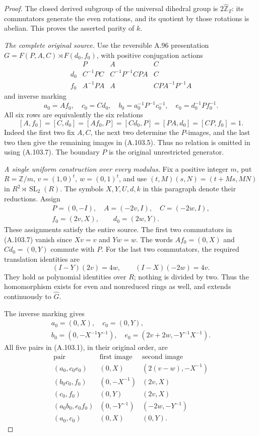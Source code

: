 \begin{proof}
The closed derived subgroup of the universal dihedral group is
\(2\widehat{\mathbb Z}_{T}\): its commutators generate the even
rotations, and its quotient by those rotations is abelian.
This proves the asserted parity of \(k\).

\emph{The complete original source.}
Use the reversible A.96 presentation
\(G=F(P,A,C)\rtimes F(d_0,f_0)\), with positive conjugation actions
\[
 \begin{array}{c|ccc}
    &P&A&C\\ \hline
 d_0&C^{-1}PC&C^{-1}P^{-1}CPA&C\\
 f_0&A^{-1}PA&A&CPA^{-1}P^{-1}A
 \end{array}
 \tag{A.103.5}
\]
and inverse marking
\[
 a_0=Af_0,\quad c_0=Cd_0,\quad
 b_0=a_0^{-1}P^{-1}c_0^{-1},\quad
 e_0=d_0^{-1}Pf_0^{-1}.
 \tag{A.103.6}
\]
All six rows are equivalently the six relations
\[
 [A,f_0]=[C,d_0]=[Af_0,P]=[Cd_0,P]
       =[PA,d_0]=[CP,f_0]=1.
 \tag{A.103.7}
\]
Indeed the first two fix \(A,C\), the next two determine the
\(P\)-images, and the last two then give the remaining images
in (A.103.5). Thus no relation is omitted in using (A.103.7).
The boundary \(P\) is the original unrestricted generator.

\emph{A single uniform construction over every modulus.}
Fix a positive integer \(m\), put \(R=\mathbb Z/m\),
\(v=(1,0)^t,\ w=(0,1)^t\), and use
\((t,M)(s,N)=(t+Ms,MN)\) in
\(R^2\rtimes\operatorname{SL}_2(R)\).
The symbols \(X,Y,U,d,k\) in this paragraph denote their reductions.
Assign
\[
 \begin{gathered}
 P=(0,-I),\quad A=(-2v,I),\quad C=(-2w,I),\\
 f_0=(2v,X),\qquad d_0=(2w,Y).
 \end{gathered}
 \tag{A.103.8}
\]
These assignments satisfy the entire source. The first two
commutators in (A.103.7) vanish since \(Xv=v\) and \(Yw=w\).
The words \(Af_0=(0,X)\) and \(Cd_0=(0,Y)\) commute with \(P\).
For the last two commutators, the required translation identities are
\[
 (I-Y)(2v)=4w,\qquad (I-X)(-2w)=4v.
 \tag{A.103.9}
\]
They hold as polynomial identities over \(R\); nothing is divided
by two. Thus the homomorphism exists for even and nonreduced rings
as well, and extends continuously to \(\widehat G\).

The inverse marking gives
\[
 \begin{gathered}
 a_0=(0,X),\quad c_0=(0,Y),\\
 b_0=(0,-X^{-1}Y^{-1}),\quad
 e_0=(2v+2w,-Y^{-1}X^{-1}).
 \end{gathered}
 \tag{A.103.10}
\]
All five pairs in (A.103.1), in their original order, are
\[
 \begin{array}{c|c|c}
 \text{pair}&\text{first image}&\text{second image}\\ \hline
 (a_0,c_0e_0)&(0,X)&(2(v-w),-X^{-1})\\
 (b_0c_0,f_0)&(0,-X^{-1})&(2v,X)\\
 (c_0,f_0)&(0,Y)&(2v,X)\\
 (a_0b_0,e_0f_0)&(0,-Y^{-1})&(-2w,-Y^{-1})\\
 (a_0,c_0)&(0,X)&(0,Y).
 \end{array}
 \tag{A.103.11}
\]


\end{proof}
